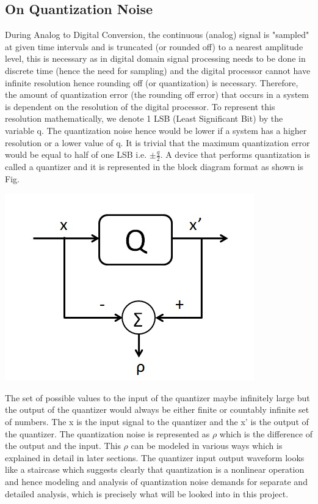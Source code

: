 \documentclass[colorlinks=true,pdfstartview=FitV,linkcolor=blue,
            citecolor=red,urlcolor=magenta]{ligodoc}
\begin{document}
\subsection{On Quantization Noise} During Analog to Digital Conversion, the continuous (analog) signal is "sampled" at given time intervals and is truncated (or rounded off) to a nearest amplitude level, this is necessary as in digital domain signal processing needs to be done in discrete time (hence the need for sampling) and the digital processor cannot have infinite resolution hence rounding off (or quantization) is necessary. Therefore, the amount of quantization error (the rounding off error) that occurs in a system is dependent on the resolution of the digital processor. To represent this resolution mathematically, we denote 1 LSB (Least Significant Bit) by the variable q. The quantization noise hence would be lower if a system has a higher resolution or a lower value of q. It is trivial that the maximum quantization error would be equal to half of one LSB i.e. $\pm\frac{q}{2}$.
A device that performs quantization is called a quantizer and it is represented in the block diagram format as shown is Fig. \\
\begin{center}
\includegraphics[scale=0.5]{Quantizer} 
\end{center}The set of possible values to the input of the quantizer maybe infinitely large but the output of the quantizer would always be either finite or countably infinite set of numbers. 
The x is the input signal to the quantizer and the x' is the output of the quantizer. The quantization noise is represented as $\rho$ which is the difference of the output and the input. This $\rho$ can be modeled in various ways which is explained in detail in later sections. The quantizer input output waveform looks like a staircase which suggests clearly that quantization is a nonlinear operation and hence modeling and analysis of quantization noise demands for separate and detailed analysis, which is precisely what will be looked into in this project. 
\end{document}
